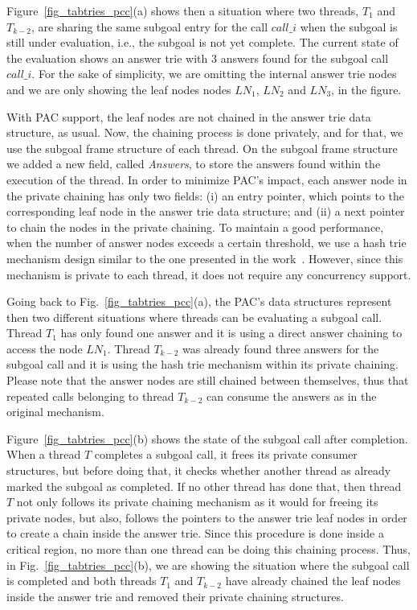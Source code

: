 \documentclass{llncs}
\begin{document}
Figure~\ref{fig_tabtries_pcc}(a) shows then a situation where two
threads, $T_1$ and $T_{k-2}$, are sharing the same subgoal entry for
the call $call\_i$ when the subgoal is still under evaluation, i.e.,
the subgoal is not yet complete. The current state of the evaluation
shows an answer trie with 3 answers found for the subgoal call
$call\_i$. For the sake of simplicity, we are omitting the internal
answer trie nodes and we are only showing the leaf nodes nodes $LN_1$,
$LN_2$ and $LN_3$, in the figure.

With PAC support, the leaf nodes are not chained in the answer trie
data structure, as usual. Now, the chaining process is done privately,
and for that, we use the subgoal frame structure of each thread. On
the subgoal frame structure we added a new field, called
\emph{Answers}, to store the answers found within the execution of the
thread. In order to minimize PAC's impact, each answer node in the
private chaining has only two fields: (i) an entry pointer, which
points to the corresponding leaf node in the answer trie data
structure; and (ii) a next pointer to chain the nodes in the private
chaining. To maintain a good performance, when the number of answer
nodes exceeds a certain threshold, we use a hash trie mechanism design
similar to the one presented in the
work~\cite{Areias-ijpp15}. However, since this mechanism is private to
each thread, it does not require any concurrency support.

Going back to Fig.~\ref{fig_tabtries_pcc}(a), the PAC's data
structures represent then two different situations where threads can
be evaluating a subgoal call. Thread $T_1$ has only found one answer
and it is using a direct answer chaining to access the node
$LN_1$. Thread $T_{k-2}$ was already found three answers for the
subgoal call and it is using the hash trie mechanism within its
private chaining. Please note that the answer nodes are still chained
between themselves, thus that repeated calls belonging to thread
$T_{k-2}$ can consume the answers as in the original mechanism.

Figure~\ref{fig_tabtries_pcc}(b) shows the state of the subgoal call
after completion. When a thread $T$ completes a subgoal call, it frees
its private consumer structures, but before doing that, it checks
whether another thread as already marked the subgoal as completed. If
no other thread has done that, then thread $T$ not only follows its
private chaining mechanism as it would for freeing its private nodes,
but also, follows the pointers to the answer trie leaf nodes in order
to create a chain inside the answer trie. Since this procedure is done
inside a critical region, no more than one thread can be doing this
chaining process. Thus, in Fig.~\ref{fig_tabtries_pcc}(b), we are
showing the situation where the subgoal call is completed and both
threads $T_1$ and $T_{k-2}$ have already chained the leaf nodes inside
the answer trie and removed their private chaining structures.
\end{document}
